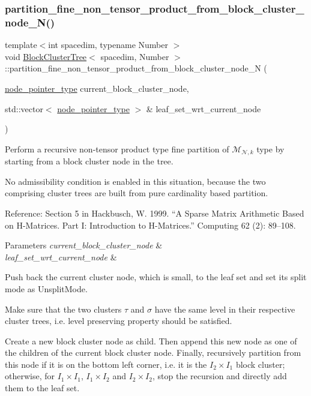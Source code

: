 \subsubsection{\texorpdfstring{partition\+\_\+fine\+\_\+non\+\_\+tensor\+\_\+product\+\_\+from\+\_\+block\+\_\+cluster\+\_\+node\+\_\+\+N()}{partition\_fine\_non\_tensor\_product\_from\_block\_cluster\_node\_N()}}
{\footnotesize\ttfamily template$<$int spacedim, typename Number $>$ \\
void \hyperlink{classBlockClusterTree}{Block\+Cluster\+Tree}$<$ spacedim, Number $>$\+::partition\+\_\+fine\+\_\+non\+\_\+tensor\+\_\+product\+\_\+from\+\_\+block\+\_\+cluster\+\_\+node\+\_\+N (\begin{DoxyParamCaption}\item[{\hyperlink{classTreeNode}{node\+\_\+pointer\+\_\+type}}]{current\+\_\+block\+\_\+cluster\+\_\+node,  }\item[{std\+::vector$<$ \hyperlink{classTreeNode}{node\+\_\+pointer\+\_\+type} $>$ \&}]{leaf\+\_\+set\+\_\+wrt\+\_\+current\+\_\+node }\end{DoxyParamCaption})\hspace{0.3cm}{\ttfamily [private]}}

Perform a recursive non-\/tensor product type fine partition of $\mathcal{M}_{\mathcal{N},k}$ type by starting from a block cluster node in the tree.

No admissibility condition is enabled in this situation, because the two comprising cluster trees are built from pure cardinality based partition.

Reference\+: Section 5 in Hackbusch, W. 1999. “A Sparse Matrix Arithmetic Based on H-\/\+Matrices. Part I\+: Introduction to H-\/\+Matrices.” Computing 62 (2)\+: 89–108. 
\begin{DoxyParams}{Parameters}
{\em current\+\_\+block\+\_\+cluster\+\_\+node} & \\
\hline
{\em leaf\+\_\+set\+\_\+wrt\+\_\+current\+\_\+node} & \\
\hline
\end{DoxyParams}
Push back the current cluster node, which is small, to the leaf set and set its split mode as {\ttfamily Unsplit\+Mode}.

Make sure that the two clusters $\tau$ and $\sigma$ have the same level in their respective cluster trees, i.\+e. level preserving property should be satisfied.

Create a new block cluster node as child. Then append this new node as one of the children of the current block cluster node. Finally, recursively partition from this node if it is on the bottom left corner, i.\+e. it is the $I_2 \times I_1$ block cluster; otherwise, for $I_1 \times I_1$, $I_1 \times I_2$ and $I_2 \times I_2$, stop the recursion and directly add them to the leaf set.

